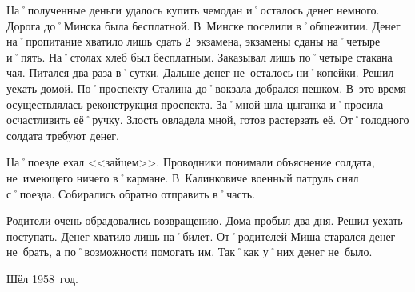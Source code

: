 На˚полученные деньги удалось купить чемодан и˚осталось денег немного. Дорога до˚Минска была бесплатной. В~Минске поселили в˚общежитии. Денег на˚пропитание хватило лишь сдать 2~экзамена, экзамены сданы на˚четыре и˚пять. На˚столах хлеб был бесплатным. Заказывал лишь по˚четыре стакана чая. Питался два раза в˚сутки. Дальше денег не~осталось ни˚копейки. Решил уехать домой. По˚проспекту Сталина до˚вокзала добрался пешком. В~это время осуществлялась реконструкция проспекта. За˚мной шла цыганка и˚просила осчастливить её˚ручку. Злость овладела мной, готов растерзать её. От˚голодного солдата требуют денег.

На˚поезде ехал <<зайцем>>. Проводники понимали объяснение солдата, не~имеющего ничего в˚кармане. В~Калинковиче военный патруль снял с˚поезда. Собирались обратно отправить в˚часть. 

Родители очень обрадовались возвращению. Дома пробыл два дня. Решил уехать поступать. Денег хватило лишь на˚билет. От˚родителей Миша старался денег не~брать, а по˚возможности помогать им. Так˚как у˚них денег не~было.

Шёл 1958~год.